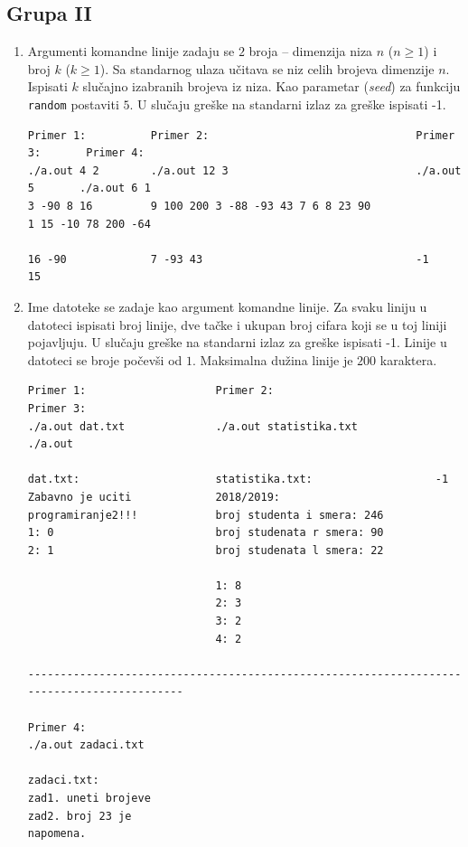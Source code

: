 \subsection{Grupa II}

\begin{enumerate} 
\item Argumenti komandne linije zadaju se $2$ broja -- dimenzija niza $n$ ($n \ge 1$)
i broj $k$ ($k \ge 1$). Sa standarnog ulaza u\v citava se niz  celih brojeva
dimenzije $n$. Ispisati $k$ slu\v cajno izabranih brojeva iz niza. Kao
parametar ({\em seed}) za funkciju {\tt random} postaviti $5$. U slu\v
caju gre\v ske na standarni izlaz za gre\v ske ispisati -1.
\begin{verbatim}
Primer 1:          Primer 2:                                Primer 3:       Primer 4:
./a.out 4 2        ./a.out 12 3                             ./a.out 5       ./a.out 6 1
3 -90 8 16         9 100 200 3 -88 -93 43 7 6 8 23 90                       1 15 -10 78 200 -64

16 -90             7 -93 43                                 -1              15        
\end{verbatim}

\item Ime datoteke se zadaje kao argument komandne linije. Za svaku liniju u
datoteci ispisati broj linije, dve ta\v cke i ukupan broj cifara koji se u toj
liniji pojavljuju. U slu\v caju gre\v ske na standarni izlaz za gre\v ske
ispisati -1. Linije u datoteci se broje po\v cev\v si od $1$. Maksimalna du\v
zina linije je $200$ karaktera.
\begin{verbatim}
Primer 1:                    Primer 2:                         Primer 3:
./a.out dat.txt              ./a.out statistika.txt            ./a.out 

dat.txt:                     statistika.txt:                   -1
Zabavno je uciti             2018/2019:
programiranje2!!!            broj studenta i smera: 246
1: 0                         broj studenata r smera: 90
2: 1                         broj studenata l smera: 22

                             1: 8
                             2: 3
                             3: 2
                             4: 2

-------------------------------------------------------------------------------------------

Primer 4:
./a.out zadaci.txt

zadaci.txt:
zad1. uneti brojeve
zad2. broj 23 je
napomena.                             


\end{verbatim}
\end{enumerate}
